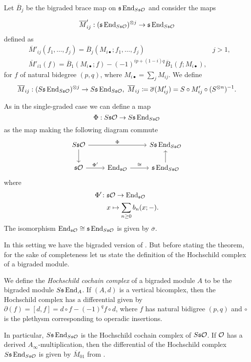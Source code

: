 \documentclass[Thesis.tex]{subfiles}
\begin{document}
Let $\overline{B}_j$ be the bigraded brace map on $\mathfrak{s}\operatorname{End}_{S\mathfrak{s}{\mathcal O}}$ and consider the maps

\begin{equation}\label{barbimaps}
\overline{M}'_{ij}:(\mathfrak{s}\operatorname{End}_{S\mathfrak{s}{\mathcal O}})^{\otimes j}\to \mathfrak{s}\operatorname{End}_{S\mathfrak{s}{\mathcal O}}
\end{equation}
defined as 
\begin{align*}
&\overline{M}'_{ij}(f_1,\dots,f_j)=\overline{B}_j(M_{i\bullet};f_1,\dots, f_j) & j>1,\\
&\overline{M}'_{i1}(f)=\overline{B}_1(M_{i\bullet};f)-(-1)^{ip+(1-i)q}\overline{B}_1(f;M_{i\bullet}),
\end{align*}
for $f$ of natural bidegree $(p,q)$, where $M_{i\bullet}=\sum_j M_{ij}$. We define 
\[
\overline{M}_{ij}:(S\mathfrak{s}\operatorname{End}_{S\mathfrak{s}{\mathcal O}})^{\otimes j}\to S\mathfrak{s}\operatorname{End}_{S\mathfrak{s}{\mathcal O}},\ \overline{M}_{ij} \coloneqq \overline{\sigma}(M'_{ij})=S\circ M'_{ij}\circ (S^{\otimes n})^{-1}.
\]

As in the single-graded case we can define a map
\[\Phi:S\mathfrak{s}{\mathcal O}\to S\mathfrak{s}\operatorname{End}_{S\mathfrak{s}{\mathcal O}}\]
as the map making the following diagram commute
\begin{equation}\label{derivedPhi}
\begin{tikzcd}
S\s\OO\arrow[rr, "\Phi"]\arrow[d] & & S\s\End_{S\s\OO}\\
\s\OO\arrow[r, "\Phi'"]& \End_{\s\OO}\arrow[r, "\cong"]& \s\End_{S\s\OO}\arrow[u]
\end{tikzcd}
\end{equation}
where 
\begin{align*}
\Phi'\colon&\mathfrak{s}{\mathcal O} \to \operatorname{End}_{\mathfrak{s}{\mathcal O}}\\
&x\mapsto \sum_{n\geq 0}b_n(x;-).
\end{align*}
The isomorphism $\operatorname{End}_{\mathfrak{s}{\mathcal O}}\cong\mathfrak{s}\operatorname{End}_{S\mathfrak{s}{\mathcal O}}$ is given by $\overline{\sigma}$.

In this setting we have the bigraded version of . But before stating the theorem, for the sake of completeness let us state the definition of the Hochschild complex of a bigraded module.
\begin{defin}
We define the \emph{Hochschild cochain complex} of a bigraded module $A$ to be the bigraded module $S\mathfrak{s}\operatorname{End}_A$. If $(A,d)$ is a vertical bicomplex, then the Hochschild complex has a differential given by $\partial(f)=[d,f]=d\circ f-(-1)^{q}f\circ d$, where $f$ has natural bidigree $(p,q)$ and $\circ$ is the plethysm corresponding to operadic insertions.
\end{defin}
In particular, $S\mathfrak{s}\operatorname{End}_{S\mathfrak{s}{\mathcal O}}$ is the Hochschild cochain complex of $S\mathfrak{s}{\mathcal O}$. If ${\mathcal O}$ has a derived $A_\infty$-multiplication, then the differential of the Hochschild complex $S\mathfrak{s}\operatorname{End}_{S\mathfrak{s}{\mathcal O}}$ is given by $\overline{M}_{01}$ from .
\end{document}
